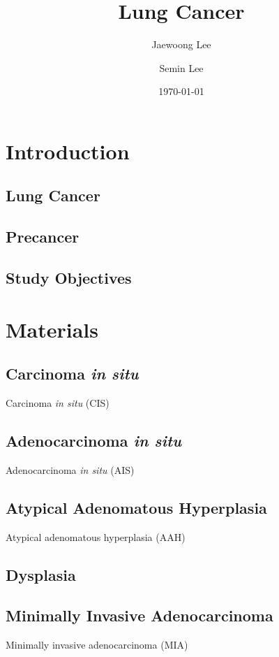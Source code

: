 \documentclass[a4paper]{article}
\title{Lung Cancer}
\author{
    Jaewoong Lee
    \and
    Semin Lee
}
\date{\today}
\begin{document}
    \maketitle
    \newpage

    \tableofcontents
    \listoftables
    \listoffigures
    \newpage

    \section{Introduction}
        \subsection{Lung Cancer}

        \subsection{Precancer}

        \subsection{Study Objectives}

    \section{Materials}
        \subsection{Carcinoma \textit{in situ}}
            Carcinoma \textit{in situ} (CIS)

        \subsection{Adenocarcinoma \textit{in situ}}
            Adenocarcinoma \textit{in situ} (AIS)

        \subsection{Atypical Adenomatous Hyperplasia}
            Atypical adenomatous hyperplasia (AAH)

        \subsection{Dysplasia}

        \subsection{Minimally Invasive Adenocarcinoma}
            Minimally invasive adenocarcinoma (MIA)
\end{document}
